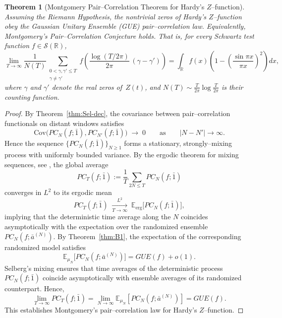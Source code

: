 \documentclass[12pt,reqno]{amsart}
\theoremstyle{plain}
\newtheorem{theorem}{Theorem}[section]
\theoremstyle{definition}
\theoremstyle{remark}
\begin{document}
\begin{theorem}[Montgomery Pair--Correlation Theorem for Hardy’s $Z$--function]
\label{thm:9.2}
Assuming the Riemann Hypothesis, the nontrivial zeros of Hardy’s $Z$--function 
obey the Gaussian Unitary Ensemble (GUE) pair--correlation law.  
Equivalently, Montgomery’s Pair--Correlation Conjecture holds.  
That is, for every Schwartz test function $f \in \mathcal{S}(\mathbb{R})$,
\begin{equation}\label{eq:PCC-thmB}
\lim_{T \to \infty}
\frac{1}{N(T)}
\!\!\sum_{\substack{0<\gamma,\gamma'\le T\\\gamma\ne\gamma'}}
f\!\left(
\frac{\log(T/2\pi)}{2\pi}\,(\gamma-\gamma')
\right)
=
\int_{\mathbb{R}} 
f(x)
\!\left(
1-\left(\frac{\sin\pi x}{\pi x}\right)^{\!2}
\right)
dx,
\end{equation}
where $\gamma$ and $\gamma'$ denote the real zeros of~$Z(t)$, 
and $N(T)\sim \tfrac{T}{2\pi}\log\!\tfrac{T}{2\pi}$ is their counting function. 
\end{theorem}


\begin{proof}
By Theorem~\ref{thm:Sel-dec}, the covariance between pair--correlation functionals on distant windows satisfies
\begin{equation}
\mathrm{Cov}\!\bigl(PC_N(f;\bar1),PC_{N'}(f;\bar1)\bigr)\;\to\;0
\qquad\text{as}\qquad |N-N'|\to\infty.
\end{equation}
Hence the sequence $\{PC_N(f;\bar1)\}_{N\ge1}$ forms a stationary, strongly--mixing process with uniformly bounded variance.
By the ergodic theorem for mixing sequences, see \cite{IbragimovLinnik1971, Billingsley1995Probability},
the global average
\begin{equation}
PC_T(f;\bar1)
:=\frac{1}{T}\!\!\sum_{2N\le T} PC_N(f;\bar1)
\end{equation}
converges in $L^2$ to its ergodic mean
\begin{equation}
PC_T(f;\bar1)\;\xrightarrow[T\to\infty]{L^2}\;
\mathbb{E}_{\mathrm{erg}}\!\bigl[PC_N(f;\bar1)\bigr],
\end{equation}
 implying that the deterministic 
time average along the $N$ coincides asymptotically with
the expectation over the randomized ensemble 
$PC_N(f;\bar a^{(N)})$.
By Theorem~\ref{thm:B1}, the expectation of the corresponding randomized model satisfies
\begin{equation}
\mathbb{E}_{\mu_N}\!\bigl[PC_N(f;\bar a^{(N)})\bigr]
= GUE(f) + o(1).
\end{equation}
Selberg’s mixing ensures that time averages of the deterministic process 
$PC_N(f;\bar1)$ coincide asymptotically with ensemble averages of its randomized counterpart.
Hence,
\begin{equation}
\lim_{T\to\infty} PC_T(f;\bar1)
=\lim_{N\to\infty}\mathbb{E}_{\mu_N}[PC_N(f;\bar a^{(N)})]
= GUE(f).
\end{equation}
This establishes Montgomery’s pair--correlation law for Hardy’s $Z$--function.
\end{proof}
\end{document}

